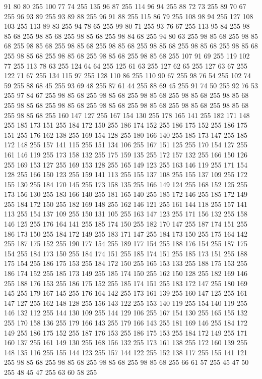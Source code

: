 91 80 80 255 100 77 74 255 135 96 87 255 114 96 94 255 88 72 73 255 89 70 67 255 96 93 89 255 93 89 88 255 96 91 88 255 115 86 79 255 108 98 94 255 127 108 103 255 113 89 83 255 94 78 65 255 99 80 71 255 93 76 67 255 113 95 84 255 98 85 68 255 98 85 68 255 98 85 68 255 98 84 68 255 94 80 63 255 98 85 68 255 98 85 68 255 98 85 68 255 98 85 68 255 98 85 68 255 98 85 68 255 98 85 68 255 98 85 68 255 98 85 68 255 98 85 68 255 98 85 68 255 98 85 68 255 107 91 69 255 119 102 77 255 113 78 63 255 124 64 64 255 125 61 63 255 127 62 65 255 127 63 67 255 122 71 67 255 134 115 97 255 128 110 86 255 110 90 67 255 98 76 54 255 102 74 59 255 88 68 45 255 93 69 48 255 87 61 44 255 88 69 45 255 91 74 50 255 92 76 53 255 97 84 67 255 98 85 68 255 98 85 68 255 98 85 68 255 98 85 68 255 98 85 68 255 98 85 68 255 98 85 68 255 98 85 68 255 98 85 68 255 98 85 68 255
98 85 68 255 98 85 68 255 160 147 127 255 167 154 130 255 178 165 141 255 182 171 148 255 185 173 151 255 184 172 150 255 186 174 152 255 186 175 152 255 186 175 151 255 176 162 138 255 169 154 128 255 180 166 140 255 185 173 147 255 185 172 148 255 157 141 115 255 151 134 106 255 167 151 125 255 170 154 127 255 161 146 119 255 173 158 132 255 175 159 135 255 172 157 132 255 166 150 126 255 169 153 127 255 169 153 128 255 165 149 123 255 163 146 119 255 171 154 128 255 166 150 123 255 159 141 113 255 155 137 108 255 155 137 109 255 172 155 130 255 184 170 145 255 173 158 135 255 166 149 124 255 168 152 125 255 173 156 130 255 183 166 140 255 181 165 140 255 185 172 146 255 185 172 149 255 184 172 150 255 182 169 148 255 162 146 121 255 161 144 118 255 157 141 113 255 154 137 109 255 150 131 105 255 163 147 123 255 171 156 132 255 158 146 125 255 176 164 141 255 185 174 150 255 182 170 147 255 187 174 151 255 186 173 150 255 184 172 149 255 183 171 147 255 184 173 150 255 175 164 142 255 187 175 152 255
190 177 154 255 189 177 154 255 188 176 154 255 187 175 154 255 184 173 150 255 184 174 151 255 185 174 151 255 185 173 151 255 188 175 154 255 186 175 153 255 184 172 150 255 165 153 133 255 188 175 153 255 186 174 152 255 185 173 149 255 185 174 150 255 162 150 128 255 182 169 146 255 188 176 153 255 186 175 152 255 185 174 151 255 183 172 147 255 180 169 145 255 179 167 145 255 176 164 142 255 173 161 139 255 160 147 125 255 161 147 127 255 162 148 128 255 156 143 122 255 153 140 119 255 154 140 119 255 146 132 112 255 144 130 109 255 144 129 106 255 167 154 130 255 165 155 132 255 170 158 136 255 179 166 143 255 179 166 143 255 181 169 146 255 184 172 149 255 186 175 152 255 187 176 153 255 186 175 153 255 184 172 149 255 171 160 137 255 161 149 130 255 168 156 132 255 173 161 138 255 172 160 139 255 148 135 116 255 155 144 123 255 157 144 122 255 152 138 117 255 155 141 121 255 98 85 68 255 98 85 68 255 98 85 68 255 98 85 68 255 66 61 57 255 45 47 50 255 48 45 47 255 63 60 58 255
